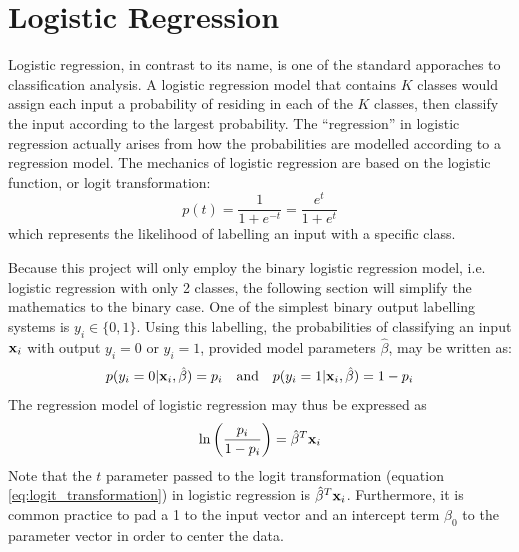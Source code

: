 \documentclass[nofootinbib,reprint,english]{revtex4-1}
\newcommand{\betahat}{\hat{\beta}}
\begin{document}
\section{Logistic Regression}
Logistic regression, in contrast to its name, is one of the standard apporaches to classification analysis. A logistic regression model that contains \(K\) classes would assign each input a probability of residing in each of the \(K\) classes, then classify the input according to the largest probability. The ``regression'' in logistic regression actually arises from how the probabilities are modelled according to a regression model. The mechanics of logistic regression are based on the logistic function, or logit transformation:
\begin{equation}\label{eq:logit_transformation}
p(t)=\frac{1}{1+e^{-t}}=\frac{e^t}{1+e^t}
\end{equation}
which represents the likelihood of labelling an input with a specific class.

Because this project will only employ the binary logistic regression model, i.e. logistic regression with only 2 classes, the following section will simplify the mathematics to the binary case. One of the simplest binary output labelling systems is \(y_i\in\{0,1\}\). Using this labelling, the probabilities of classifying an input \(\vb{x}_i\) with output \(y_i=0\) or \(y_i=1\), provided model parameters \(\betahat\), may be written as:
\[p(y_i=0|\vb{x}_i,\betahat)=p_i\qand p(y_i=1|\vb{x}_i,\betahat)=1-p_i\]
The regression model of logistic regression may thus be expressed as
\begin{equation}
\ln\bigg(\frac{p_i}{1-p_i}\bigg)=\betahat^T\vb{x}_i
\end{equation}
Note that the \(t\) parameter passed to the logit transformation (equation \eqref{eq:logit_transformation}) in logistic regression is \(\betahat^T\vb{x}_i\). Furthermore, it is common practice to pad a 1 to the input vector and an intercept term \(\beta_0\) to the parameter vector in order to center the data.
\end{document}
